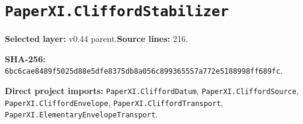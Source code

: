 \documentclass[10pt,oneside]{book}
\begin{document}
\section{\texorpdfstring{\nolinkurl{PaperXI.CliffordStabilizer}}{PaperXI.CliffordStabilizer}}\label{module:PaperXI.CliffordStabilizer}

\textbf{Selected layer:} v0.44 parent.\quad\textbf{Source lines:} 216.\par\textbf{SHA-256:} {\scriptsize\nolinkurl{6bc6cae8489f5025d88e5dfe8375db8a056c899365557a772e5188998ff689fc}}.


\textbf{Direct project imports:} \nolinkurl{PaperXI.CliffordDatum}, \nolinkurl{PaperXI.CliffordSource}, \nolinkurl{PaperXI.CliffordEnvelope}, \nolinkurl{PaperXI.CliffordTransport}, \nolinkurl{PaperXI.ElementaryEnvelopeTransport}.
\end{document}
